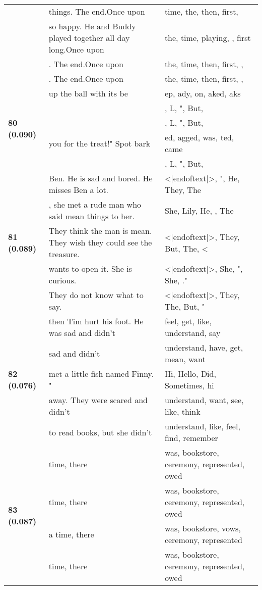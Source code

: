 \documentclass{article}
\begin{document}
\begin{adjustbox}{max width=\textwidth}
\begin{tabular}{p{} p{} p{}}
 & things. The end.Once upon & time,  the,  then,  first, \\
 & so happy. He and Buddy played together all day long.Once upon & the,  time,  playing,  ,  first \\
 & . The end.Once upon & the,  time,  then,  first, , \\
 & . The end.Once upon & the,  time,  then,  first, , \\
\midrule
\multirow{5}{*}{\textbf{80 (0.090)}} & up the ball with its be & ep, ady, on, aked, aks \\
 &  & , L, ", But, \\
 &  & , L, ", But, \\
 & you for the treat!" Spot bark & ed, agged,  was, ted,  came \\
 &  & , L, ", But, \\
\midrule
\multirow{5}{*}{\textbf{81 (0.089)}} & Ben. He is sad and bored. He misses Ben a lot. & <|endoftext|>, ", He, They, The \\
 & , she met a rude man who said mean things to her. & She,  Lily,  He,  ,  The \\
 & They think the man is mean. They wish they could see the treasure. & <|endoftext|>, They, But, The, < \\
 & wants to open it. She is curious. & <|endoftext|>, She, ",  She, ." \\
 & They do not know what to say. & <|endoftext|>, They, The, But, " \\
\midrule
\multirow{5}{*}{\textbf{82 (0.076)}} & then Tim hurt his foot. He was sad and didn't & feel,  get,  like,  understand,  say \\
 & sad and didn't & understand,  have,  get,  mean,  want \\
 & met a little fish named Finny.  " & Hi, Hello, Did, Sometimes, hi \\
 & away. They were scared and didn't & understand,  want,  see,  like,  think \\
 & to read books, but she didn't & understand,  like,  feel,  find,  remember \\
\midrule
\multirow{5}{*}{\textbf{83 (0.087)}} & time, there & was,  bookstore,  ceremony,  represented,  owed \\
 & time, there & was,  bookstore,  ceremony,  represented,  owed \\
 & a time, there & was,  bookstore,  vows,  ceremony,  represented \\
 & time, there & was,  bookstore,  ceremony,  represented,  owed \\

\end{tabular}
\end{adjustbox}
\end{document}
